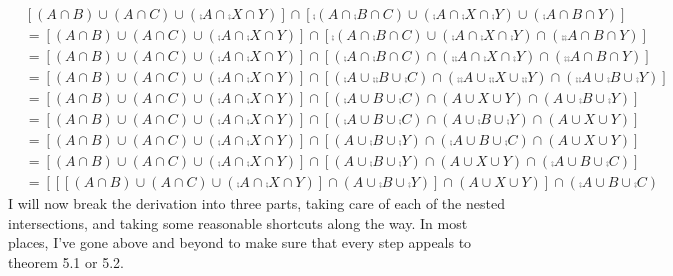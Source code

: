 \documentclass[11pt]{book}
\begin{document}
\begin{enumerate}
\begin{enumerate}
{\begin{align*}&[(A \cap B) \cup (A \cap C) \cup (\comp{A} \cap \comp{X} \cap Y)] \cap [\comp{(A \cap \comp{B} \cap C) \cup (\comp{A} \cap \comp{X} \cap \comp{Y}) \cup (\comp{A} \cap B \cap Y)}] \\&= [(A \cap B) \cup (A \cap C) \cup (\comp{A} \cap \comp{X} \cap Y)] \cap [\comp{(A \cap \comp{B} \cap C) \cup (\comp{A} \cap \comp{X} \cap \comp{Y})} \cap (\comp{\comp{A} \cap B \cap Y})]\tag{5.2.13}\\&= [(A \cap B) \cup (A \cap C) \cup (\comp{A} \cap \comp{X} \cap Y)] \cap [(\comp{A \cap \comp{B} \cap C}) \cap (\comp{\comp{A} \cap \comp{X} \cap \comp{Y}}) \cap (\comp{\comp{A} \cap B \cap Y})] \tag{5.2.13}\\&= [(A \cap B) \cup (A \cap C) \cup (\comp{A} \cap \comp{X} \cap Y)] \cap [(\comp{A} \cup \comp{\comp{B}} \cup \comp{C}) \cap (\comp{\comp{A}} \cup \comp{\comp{X}} \cup \comp{\comp{Y}}) \cap (\comp{\comp{A}} \cup \comp{B} \cup \comp{Y})]\tag{5.2.13'}\\&= [(A \cap B) \cup (A \cap C) \cup (\comp{A} \cap \comp{X} \cap Y)] \cap [(\comp{A} \cup B \cup \comp{C}) \cap (A \cup X \cup Y) \cap (A \cup \comp{B} \cup \comp{Y})]\tag{5.2.8}\\&= [(A \cap B) \cup (A \cap C) \cup (\comp{A} \cap \comp{X} \cap Y)] \cap [(\comp{A} \cup B \cup \comp{C}) \cap (A \cup \comp{B} \cup \comp{Y}) \cap (A \cup X \cup Y)]\tag{5.1.2'}\\&= [(A \cap B) \cup (A \cap C) \cup (\comp{A} \cap \comp{X} \cap Y)] \cap [(A \cup \comp{B} \cup \comp{Y}) \cap (\comp{A} \cup B \cup \comp{C}) \cap (A \cup X \cup Y)]\tag{5.1.2'}\\&= [(A \cap B) \cup (A \cap C) \cup (\comp{A} \cap \comp{X} \cap Y)] \cap [(A \cup \comp{B} \cup \comp{Y})  \cap (A \cup X \cup Y) \cap (\comp{A} \cup B \cup \comp{C})]\tag{5.1.2'}\\&= [[[(A \cap B) \cup (A \cap C) \cup (\comp{A} \cap \comp{X} \cap Y)] \cap (A \cup \comp{B} \cup \comp{Y})] \cap (A \cup X \cup Y)] \cap (\comp{A} \cup B \cup \comp{C})\tag{5.1.1'}\end{align*}
I will now break the derivation into three parts, taking care of each of the nested intersections, and taking some reasonable shortcuts along the way. In most places, I've gone above and beyond to make sure that every step appeals to theorem 5.1 or 5.2.\pagebreak
}
\end{enumerate}
\end{enumerate}
\end{document}
